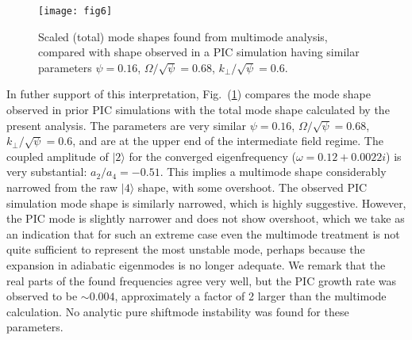 \documentclass{jpp}
\def\ket#1{|#1\rangle}
\begin{document}
\begin{figure}
  \center  \texttt{[image: fig6]}
  \caption{Scaled (total) mode shapes found from multimode analysis,
    compared with shape observed in a PIC simulation having similar
    parameters $\psi=0.16$, $\Omega/\sqrt{\psi}=0.68$,
$k_\perp/\sqrt{\psi}=0.6$.\label{piccomp}}
\end{figure}
In futher support of this interpretation, Fig.\ (\ref{piccomp})
compares the mode shape observed in prior PIC simulations
\citep{Hutchinson2019} with the total mode shape calculated by the
present analysis. The parameters are very similar $\psi=0.16$,
$\Omega/\sqrt{\psi}=0.68$, $k_\perp/\sqrt{\psi}=0.6$, and are at the
upper end of the intermediate field regime. The coupled amplitude of
$\ket{2}$ for the converged eigenfrequency ($\omega=0.12+0.0022i$) is
very substantial: $a_2/a_4=-0.51$. This implies a multimode shape
considerably narrowed from the raw $\ket{4}$ shape, with some
overshoot. The observed PIC simulation mode shape is similarly
narrowed, which is highly suggestive. However, the PIC mode is
slightly narrower and does not show overshoot, which we take as an
indication that for such an extreme case even the multimode treatment
is not quite sufficient to represent the most unstable mode, perhaps
because the expansion in adiabatic eigenmodes is no longer
adequate. We remark that the real parts of the found frequencies agree
very well, but the PIC growth rate was observed to be $\sim 0.004$,
approximately a factor of 2 larger than the multimode calculation. No
analytic pure shiftmode instability was found for these parameters.
\end{document}
